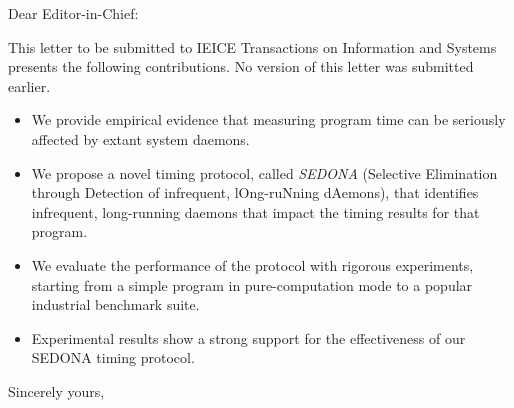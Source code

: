 \documentclass{letter} %
\begin{document}
\begin{letter}
\opening{Dear Editor-in-Chief:} 
 
\noindent This letter to be submitted to IEICE Transactions on Information and Systems 
presents the following contributions. No version of this letter was submitted earlier. 

\begin{itemize}

\item We provide empirical evidence that measuring program time 
can be seriously affected by extant system daemons.

\item We propose a novel timing protocol, called {\em SEDONA} (Selective Elimination through Detection of infrequent, lOng-ruNning dAemons), 
that identifies infrequent, long-running daemons that impact the timing results for that program. 

\item We evaluate the performance of the protocol with rigorous experiments, starting from a simple program in pure-computation mode 
to a popular industrial benchmark suite.

\item Experimental results show a strong support for the effectiveness of our SEDONA timing protocol. 
\end{itemize} 
 
\closing{Sincerely yours,} 

\end{letter}
 
\end{document}
